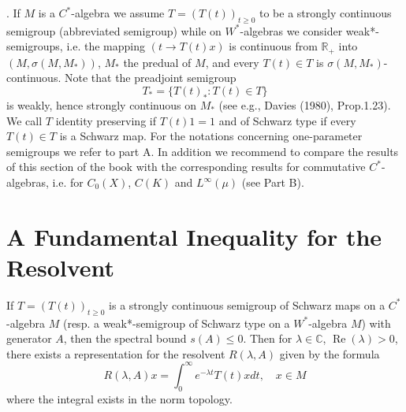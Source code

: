 \smallskip
{}. If $M$ is a $C^{*}$-algebra we assume $T = (T(t))_{t \geq 0}$ to be a strongly continuous semigroup (abbreviated semigroup) while on $W^{*}$-algebras we consider weak*-semigroups, i.e. the mapping $(t \rightarrow T(t)x)$ is continuous from $\mathbb{R}_{+}$ into $(M, \sigma(M, M_{*}))$, $M_{*}$ the predual of $M$, and every $T(t) \in T$ is $\sigma(M, M_{*})$-continuous.
Note that the preadjoint semigroup
\[
T_{*} = \{T(t)_{*} : T(t) \in T\}
\]
is weakly, hence strongly continuous on $M_{*}$ (see e.g., Davies (1980), Prop.1.23).
We call $T$ identity preserving if $T(t)1 = 1$ and of Schwarz type if every $T(t) \in T$ is a Schwarz map.
For the notations concerning one-parameter semigroups we refer to part A.
In addition we recommend to compare the results of this section of the book with the corresponding results for commutative $C^{*}$-algebras, i.e. for $C_0(X)$, $C(K)$ and $L^\infty(\mu)$ (see Part B).

\section{A Fundamental Inequality for the Resolvent}

If $T=(T(t))_{t \geq 0}$ is a strongly continuous semigroup of Schwarz maps on a $C^{*}$-algebra $M$ (resp. a weak*-semigroup of Schwarz type on a $W^{*}$-algebra $M$) with generator $A$, then the spectral bound $s(A) \leq 0$.
Then for $\lambda \in \mathbb{C}$, $\operatorname{Re}(\lambda)>0$, there exists a representation for the resolvent $R(\lambda, A)$ given by the formula
\[
R(\lambda, A)x = \int_{0}^{\infty} e^{-\lambda t} T(t)x dt, \quad x \in M
\]
where the integral exists in the norm topology.

